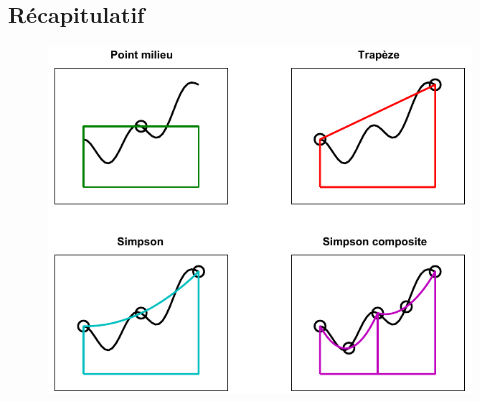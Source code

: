 \documentclass[resume]{subfiles}
\begin{document}
	\subsection{Récapitulatif}
	\begin{figure}[H]
	\centering
	\includegraphics[width=\columnwidth]{img_8.pdf}
	\end{figure}

    
\end{document}
